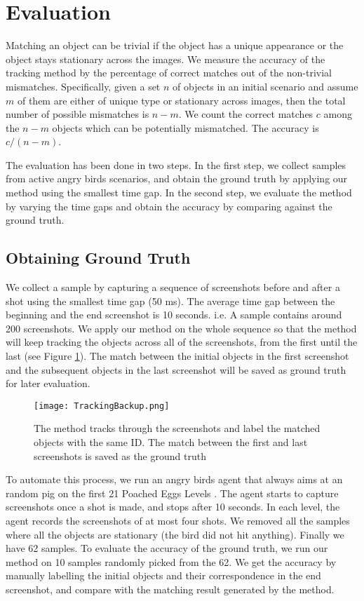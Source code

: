 \documentclass[letterpaper]{article}
\begin{document}
    

\section{Evaluation}

Matching an object can be trivial if the object has a unique appearance or the object stays stationary across the images. We measure the accuracy of the tracking method by the percentage of correct matches out of the non-trivial mismatches. Specifically, given a set $n$ of objects in an initial scenario and assume $m$ of them are either of unique type or stationary across images, then the total number of possible mismatches is $n - m$. We count the correct matches $c$ among the $n - m$ objects which can be potentially mismatched. The accuracy is  $c / (n - m)$.

The evaluation has been done in two steps. In the first step, we collect samples from active angry birds scenarios, and obtain the ground truth by applying our method using the smallest time gap. In the second step, we evaluate the method by varying the time gaps and obtain the accuracy by comparing against the ground truth.

 
\subsection{Obtaining Ground Truth}

We collect a sample by capturing a sequence of screenshots before and after a shot using the smallest time gap (50 ms). The average time gap between the beginning and the end screenshot is 10 seconds. i.e. A sample contains around 200 screenshots.  We apply our method on the whole sequence so that the method will keep tracking the objects across all of the screenshots, from the first until the last (see Figure \ref{Tracking}). The match between the initial objects in the first screenshot and the subsequent objects in the last screenshot will be saved as ground truth for later evaluation. 

\begin{figure}[h!]
\centering\texttt{[image: TrackingBackup.png]}\caption{The method tracks through the screenshots and label the matched objects with the same ID. The match between the first and last screenshots is saved as the ground truth }
\label{Tracking}
\end{figure}

To automate this process, we run an angry birds agent that always aims at an random pig on the first 21 Poached Eggs Levels \cite{abGame}. The agent starts to capture screenshots once a shot is made, and stops after 10 seconds. In each level, the agent records the screenshots of at most four shots. We removed all the samples where all the objects are stationary (the bird did not hit anything). Finally we have 62 samples.  To evaluate the accuracy of the ground truth, we run our method on 10 samples randomly picked from the 62. We get the accuracy by manually labelling the initial objects and their correspondence in the end screenshot, and compare with the matching result generated by the method. 
\end{document}
